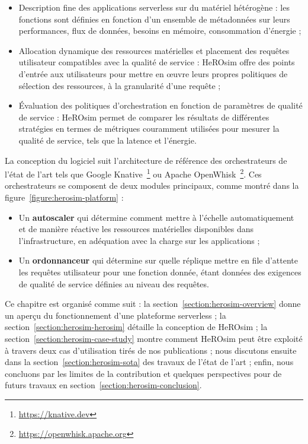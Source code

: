 \begin{itemize}
    \item Description fine des applications serverless sur du matériel hétérogène : les fonctions sont définies en fonction d'un ensemble de métadonnées sur leurs performances, flux de données, besoins en mémoire, consommation d'énergie ;
    \item Allocation dynamique des ressources matérielles et placement des requêtes utilisateur compatibles avec la qualité de service : HeROsim offre des points d'entrée aux utilisateurs pour mettre en œuvre leurs propres politiques de sélection des ressources, à la granularité d'une requête ;
    \item Évaluation des politiques d'orchestration en fonction de paramètres de qualité de service : HeROsim permet de comparer les résultats de différentes stratégies en termes de métriques couramment utilisées pour mesurer la qualité de service, tels que la latence et l'énergie.
\end{itemize}

La conception du logiciel suit l'architecture de référence des orchestrateurs de l'état de l'art tels que Google Knative~\footnote{\href{https://knative.dev}{https://knative.dev}} ou Apache OpenWhisk~\footnote{\href{https://openwhisk.apache.org}{https://openwhisk.apache.org}}. Ces orchestrateurs se composent de deux modules principaux, comme montré dans la figure~\ref{figure:herosim-platform} :

\begin{itemize}
    \item Un \textbf{autoscaler} qui détermine comment mettre à l'échelle automatiquement et de manière réactive les ressources matérielles disponibles dans l'infrastructure, en adéquation avec la charge sur les applications ;
    \item Un \textbf{ordonnanceur} qui détermine sur quelle réplique mettre en file d'attente les requêtes utilisateur pour une fonction donnée, étant données des exigences de qualité de service définies au niveau des requêtes.
\end{itemize}

Ce chapitre est organisé comme suit : la section~\ref{section:herosim-overview} donne un aperçu du fonctionnement d'une plateforme serverless ; la section~\ref{section:herosim-herosim} détaille la conception de HeROsim ; la section~\ref{section:herosim-case-study} montre comment HeROsim peut être exploité à travers deux cas d'utilisation tirés de nos publications ; nous discutons ensuite dans la section~\ref{section:herosim-sota} des travaux de l'état de l'art ; enfin, nous concluons par les limites de la contribution et quelques perspectives pour de futurs travaux en section~\ref{section:herosim-conclusion}.

